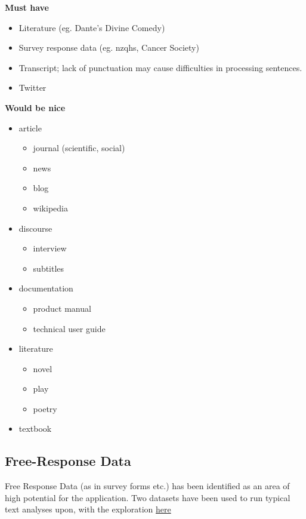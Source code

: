 \documentclass[11pt]{article}
\begin{document}
\textbf{Must have}

\begin{itemize}
\item Literature (eg. Dante's Divine Comedy)
\item Survey response data (eg. nzqhs, Cancer Society)
\item Transcript; lack of punctuation may cause difficulties in processing
sentences.
\item Twitter
\end{itemize}

\textbf{Would be nice}

\begin{itemize}
\item article
\begin{itemize}
\item journal (scientific, social)
\item news
\item blog
\item wikipedia
\end{itemize}
\item discourse
\begin{itemize}
\item interview
\item subtitles
\end{itemize}
\item documentation
\begin{itemize}
\item product manual
\item technical user guide
\end{itemize}
\item literature
\begin{itemize}
\item novel
\item play
\item poetry
\end{itemize}
\item textbook
\end{itemize}


\subsection{Free-Response Data}
\label{sec:orged92e7b}
Free Response Data (as in survey forms etc.) has been identified as an area of high potential for the application. Two datasets have been used to run typical text analyses upon, with the exploration \href{free-response.Rmd}{here}
\end{document}
